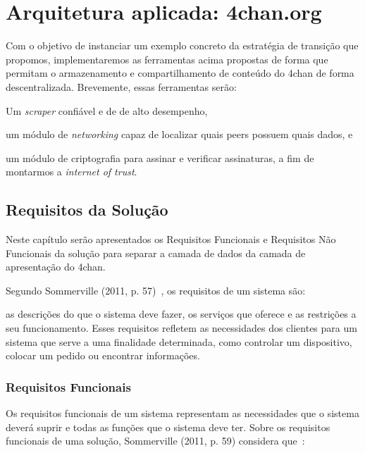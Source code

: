 


\chapter{Arquitetura aplicada: 4chan.org}

Com o objetivo de instanciar um exemplo concreto da estratégia de transição que propomos, implementaremos as ferramentas acima propostas de forma que permitam o armazenamento e compartilhamento de conteúdo do 4chan de forma descentralizada.
Brevemente, essas ferramentas serão:
\begin{enumerate*}[label=(\arabic*)]
    \item Um \textit{scraper} confiável e de de alto desempenho,
    \item um módulo de \textit{networking} capaz de localizar quais peers possuem quais dados, e
    \item um módulo de criptografia para assinar e verificar assinaturas, a fim de montarmos a \textit{internet of trust}. 
\end{enumerate*}

\section{Requisitos da Solução}

Neste capítulo serão apresentados os Requisitos Funcionais e Requisitos Não Funcionais da solução para separar a camada de dados da camada de apresentação do 4chan.

Segundo Sommerville (2011, p. 57)~\cite{SOMMERVILLE1}, os requisitos de um sistema são:

\begin{directcite}
as descrições do que o sistema deve fazer, os serviços que
oferece e as restrições a seu funcionamento.
Esses requisitos refletem as necessidades dos clientes para
um sistema que serve a uma finalidade determinada, como controlar
um dispositivo, colocar um pedido ou encontrar informações.
\end{directcite}

\subsection{Requisitos Funcionais}

Os requisitos funcionais de um sistema representam as necessidades que o sistema deverá suprir e todas as funções que o sistema deve ter.
Sobre os requisitos funcionais de uma solução, Sommerville (2011, p. 59) considera que~\cite{SOMMERVILLE1}:

